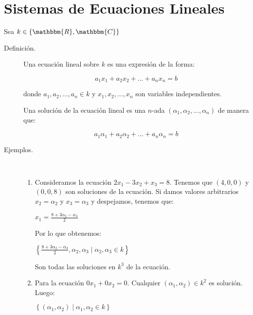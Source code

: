 \documentclass[12pt]{article}
\begin{document}
\newpage
\section{Sistemas de Ecuaciones Lineales}
Sea $k \in \{ \mathbbm{R}, \mathbbm{C} \}$

\begin{description}
\item [Definición.] Una ecuación lineal sobre $k$ es una expresión de la forma:

\begin{equation}
a_1 x_1 + a_2 x_2 + ... + a_n x_n = b
\end{equation}

donde $a_1, a_2, ..., a_n \in k$ y $x_1, x_2, ..., x_n$ son variables independientes.

Una solución de la ecuación lineal es una $n$-ada $\left( \alpha_1, \alpha_2, ..., \alpha_n \right)$ de manera que:

\begin{equation}
a_1 \alpha_1 + a_2 \alpha_2 + ... + a_n \alpha_n = b
\end{equation}

\item [Ejemplos.] \mbox{}\\

\begin{enumerate}
\item
Consideramos la ecuación $2 x_1 - 3 x_2 + x_3 = 8$.
Tenemos que $(4, 0, 0)$ y $(0, 0, 8)$ son soluciones de la ecuación.
Si damos valores arbitrarios $x_2 = \alpha_2$ y $x_3 = \alpha_3$ y despejamos, tenemos que:

\begin{math}
x_1 = \frac{8 + 3 \alpha_2 - \alpha_3}{2}
\end{math}

Por lo que obtenemos:

\begin{math}
\left\{ \frac{8 + 3 \alpha_2 - \alpha_3}{2}, \alpha_2, \alpha_3 \mid \alpha_2, \alpha_3 \in k \right\}
\end{math}

Son todas las soluciones en $k^3$ de la ecuación.

\item
Para la ecuación $0 x_1 + 0 x_2 = 0$.
Cualquier $(\alpha_1, \alpha_2) \in k^2$ es solución.
Luego:

\begin{math}
\left\{ (\alpha_1, \alpha_2) \mid \alpha_1, \alpha_2 \in k \right\}
\end{math}


\end{enumerate}
\end{description}
\end{document}
